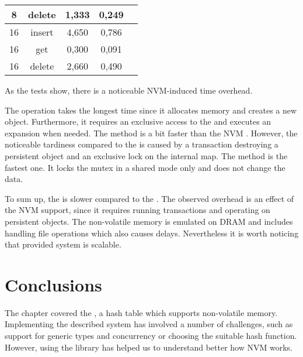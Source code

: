 \begin{table}[ht]
\begin{tabular}{|c|c|c|c|c}
                8                 & delete    & 1,333                              & 0,249                          \\
                \hline
                16                & insert    & 4,650                              & 0,786                          \\
                16                & get       & 0,300                              & 0,091                          \\
                16                & delete    & 2,660                              & 0,490                          \\
                \hline
            \end{tabular}
            \label{tablePerformance}
        \end{table}

        As the tests show, there is a noticeable NVM-induced time overhead.
        
        
        The \insertMethod operation takes the longest time since it allocates memory and creates a new object.
        Furthermore, it requires an exclusive access to the \internalHashMap and executes an expansion when needed. 
        The \removeMethod method is a bit faster than the NVM \insertMethod. 
        However, the noticeable tardiness compared to the \unorderedMap is caused by a transaction destroying a persistent object and an exclusive lock on the internal map.
        The \getMethod method is the fastest one. 
        It locks the mutex in a shared mode only and does not  change the data. 
        
        To sum up, the \NvmHashMap is slower compared to the \unorderedMap. 
        The observed overhead is an effect of the NVM support, since it requires running transactions and operating on persistent objects. 
        The non-volatile memory is emulated on DRAM and includes handling file operations which also causes delays.
        Nevertheless it is worth noticing that provided system is scalable.
        
\section{Conclusions}
    The chapter covered the \NvmHashMap, a hash table which supports non-volatile memory. Implementing the described system has involved a number of challenges, such as support for generic types and concurrency or choosing the suitable hash function. 
     However, using the \libpmemobj library has helped us to understand better how NVM works. 
    
